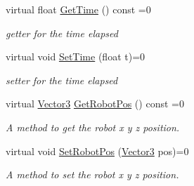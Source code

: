 \begin{DoxyCompactItemize}
virtual float \hyperlink{classIDrone_a18809d1b0626ba66984ef3a91ffb644c}{Get\+Time} () const =0
\begin{DoxyCompactList}\small\item\em getter for the time elapsed \end{DoxyCompactList}\item 
virtual void \hyperlink{classIDrone_a0ca36885fd79fbf2efa3909771218d56}{Set\+Time} (float t)=0
\begin{DoxyCompactList}\small\item\em setter for the time elapsed \end{DoxyCompactList}\item 
virtual \hyperlink{classVector3}{Vector3} \hyperlink{classIDrone_a1c3f5e712a97625c74c35952b930d68d}{Get\+Robot\+Pos} () const =0
\begin{DoxyCompactList}\small\item\em A method to get the robot x y z position. \end{DoxyCompactList}\item 
virtual void \hyperlink{classIDrone_a5851e679bf3c915e93165377cb5c8815}{Set\+Robot\+Pos} (\hyperlink{classVector3}{Vector3} pos)=0
\begin{DoxyCompactList}\small\item\em A method to set the robot x y z position. \end{DoxyCompactList}\end{DoxyCompactItemize}
